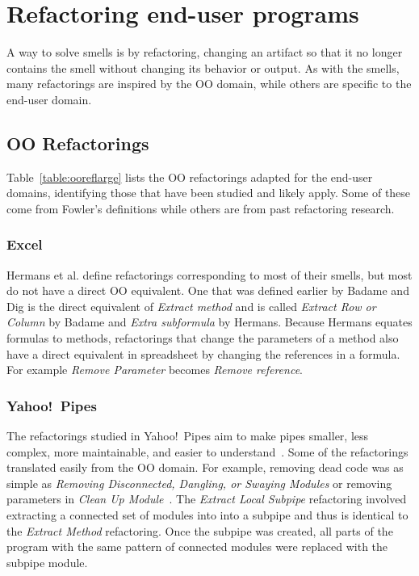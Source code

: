 \documentclass[10pt,conference,compsocconf]{IEEEtran}
\begin{document}
\section{Refactoring end-user programs}
\label{sec:refactoring}

A way to solve smells is by refactoring, changing an artifact so that it no longer contains the smell without changing its behavior or output.
As with the smells, many refactorings are inspired by the OO domain, while others are specific to the end-user domain. 

\subsection{OO Refactorings}
Table~\ref{table:ooreflarge} lists the OO refactorings adapted for the end-user domains, identifying those that have been studied and likely apply.
Some of these come from Fowler's definitions while others are from past refactoring research. 

\subsubsection{Excel}

Hermans et al. \cite{Hermans2012intraExt} define refactorings corresponding to most of their smells, but most do not have a direct OO equivalent.
One that was defined earlier by Badame and Dig \cite{badame2012refactoring} is the direct equivalent of \emph{Extract method} and is called \emph{Extract Row or Column} by Badame and \emph{Extra subformula} by Hermans.
Because Hermans equates formulas to methods, refactorings that change the parameters of a method also have a direct equivalent in spreadsheet by changing the references in a formula. For example \emph{Remove Parameter} becomes \emph{Remove reference}.
 
\subsubsection{Yahoo!\ Pipes}
The refactorings studied in Yahoo!\ Pipes aim to make pipes smaller, less complex, more maintainable, and easier to understand~\cite{StoleeTSE2013}.
Some of the refactorings translated easily from the OO domain. For example, removing dead code was as simple as \emph{Removing Disconnected, Dangling, or Swaying Modules} or removing parameters in \emph{Clean Up Module}~\cite{StoleeTSE2013}.
The \emph{Extract Local Subpipe} refactoring involved extracting a connected set of modules into into a subpipe and thus is identical to the \emph{Extract Method} refactoring.
Once the subpipe was created, all  parts of the program with the same pattern of connected modules were replaced with the subpipe module. 
\end{document}
